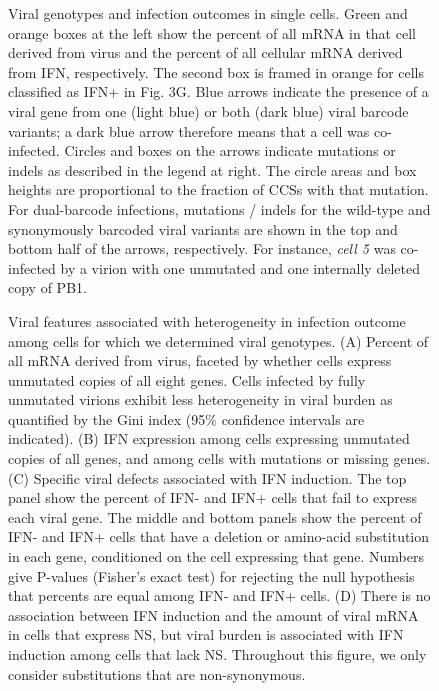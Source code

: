 \documentclass[]{article}
\begin{document}
\begin{figure}
\caption{
Viral genotypes and infection outcomes in single cells.
Green and orange boxes at the left show the percent of all mRNA in that cell derived from virus and the percent of all cellular mRNA derived from IFN, respectively.
The second box is framed in orange for cells classified as IFN+ in Fig. 3G.
Blue arrows indicate the presence of a viral gene from one (light blue) or both (dark blue) viral barcode variants; a dark blue arrow therefore means that a cell was co-infected.
Circles and boxes on the arrows indicate mutations or indels as described in the legend at right.
The circle areas and box heights are proportional to the fraction of CCSs with that mutation.
For dual-barcode infections, mutations / indels for the wild-type and synonymously barcoded viral variants are shown in the top and bottom half of the arrows, respectively.
For instance, \textit{cell 5} was co-infected by a virion with one unmutated and one internally deleted copy of PB1.
}
\end{figure}

\begin{figure}
\caption{
Viral features associated with heterogeneity in infection outcome among cells for which we determined viral genotypes.
(A) 
Percent of all mRNA derived from virus, faceted by whether cells express unmutated copies of all eight genes.
Cells infected by fully unmutated virions exhibit less heterogeneity in viral burden as quantified by the Gini index (95\% confidence intervals are indicated).
(B)
IFN expression among cells expressing unmutated copies of all genes, and among cells with mutations or missing genes.
(C)
Specific viral defects associated with IFN induction.
The top panel show the percent of IFN- and IFN+ cells that fail to express each viral gene.
The middle and bottom panels show the percent of IFN- and IFN+ cells that have a deletion or amino-acid substitution in each gene, conditioned on the cell expressing that gene.
Numbers give P-values (Fisher's exact test) for rejecting the null hypothesis that percents are equal among IFN- and IFN+ cells. 
(D)
There is no association between IFN induction and the amount of viral mRNA in cells that express NS, but viral burden is associated with IFN induction among cells that lack NS.
Throughout this figure, we only consider substitutions that are non-synonymous.
}
\end{figure}
\end{document}
